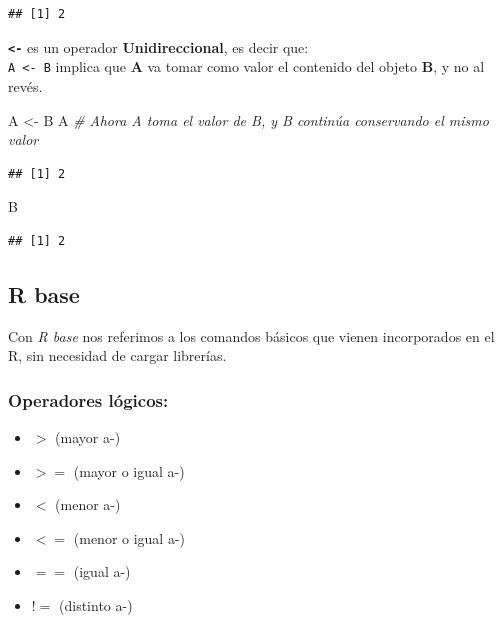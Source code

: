 \documentclass[]{book}
\newenvironment{Shaded}{\begin{snugshade}}{\end{snugshade}}
\newcommand{\CommentTok}[1]{\textcolor[rgb]{0.56,0.35,0.01}{\textit{#1}}}
\newcommand{\NormalTok}[1]{#1}
\newcommand{\StringTok}[1]{\textcolor[rgb]{0.31,0.60,0.02}{#1}}
\providecommand{\tightlist}{%
  \setlength{\itemsep}{0pt}\setlength{\parskip}{0pt}}
\begin{document}
\begin{verbatim}
## [1] 2
\end{verbatim}

\textbf{\texttt{\textless{}-}} es un operador \textbf{Unidireccional}, es decir que:\\
\texttt{A\ \textless{}-\ B} implica que \textbf{A} va tomar como valor el contenido del objeto \textbf{B}, y no al revés.

\begin{Shaded}
\begin{Highlighting}[]
\NormalTok{A <-}\StringTok{ }\NormalTok{B}
\NormalTok{A      }\CommentTok{# Ahora A toma el valor de B, y B continúa conservando el mismo valor}
\end{Highlighting}
\end{Shaded}

\begin{verbatim}
## [1] 2
\end{verbatim}

\begin{Shaded}
\begin{Highlighting}[]
\NormalTok{B}
\end{Highlighting}
\end{Shaded}

\begin{verbatim}
## [1] 2
\end{verbatim}

\hypertarget{r-base}{%
\subsection{R base}\label{r-base}}

Con \emph{R base} nos referimos a los comandos básicos que vienen incorporados en el R, sin necesidad de cargar librerías.

\hypertarget{operadores-logicos}{%
\subsubsection{Operadores lógicos:}\label{operadores-logicos}}

\begin{itemize}
\tightlist
\item
  \(>\) (mayor a-)
\item
  \(>=\) (mayor o igual a-)
\item
  \(<\) (menor a-)
\item
  \(<=\) (menor o igual a-)
\item
  \(==\) (igual a-)
\item
  \(!=\) (distinto a-)
\end{itemize}
\end{document}
